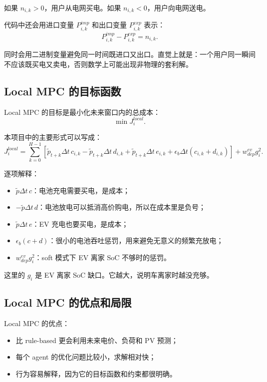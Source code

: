 \documentclass[UTF8,zihao=-4]{ctexart}
\begin{document}
如果 $n_{i,k}>0$，用户从电网买电。如果 $n_{i,k}<0$，用户向电网送电。

代码中还会用进口变量 $P^{imp}_{i,k}$ 和出口变量 $P^{exp}_{i,k}$ 表示：
\begin{equation}
P^{imp}_{i,k}-P^{exp}_{i,k}=n_{i,k}.
\end{equation}

同时会用二进制变量避免同一时间既进口又出口。直觉上就是：一个用户同一瞬间不应该既买电又卖电，否则数学上可能出现非物理的套利解。

\subsection{Local MPC 的目标函数}

Local MPC 的目标是最小化未来窗口内的总成本：
\begin{equation}
\min J_i^{local}.
\end{equation}

本项目中的主要形式可以写成：
\begin{equation}
J_i^{local}
=
\sum_{k=0}^{H-1}
\left[
\tilde p_{t+k}\Delta t\,c_{i,k}
-\tilde p_{t+k}\Delta t\,d_{i,k}
+\tilde p_{t+k}\Delta t\,e_{i,k}
+\epsilon_b\Delta t(c_{i,k}+d_{i,k})
\right]
+w^{ev}_{dep}g_i^2.
\end{equation}

逐项解释：
\begin{itemize}
  \item $\tilde p\Delta t\,c$：电池充电需要买电，是成本；
  \item $-\tilde p\Delta t\,d$：电池放电可以抵消高价购电，所以在成本里是负号；
  \item $\tilde p\Delta t\,e$：EV 充电也要买电，是成本；
  \item $\epsilon_b(c+d)$：很小的电池吞吐惩罚，用来避免无意义的频繁充放电；
  \item $w^{ev}_{dep}g_i^2$：soft 模式下 EV 离家 SoC 不够时的惩罚。
\end{itemize}

这里的 $g_i$ 是 EV 离家 SoC 缺口。它越大，说明车离家时越没充够。

\subsection{Local MPC 的优点和局限}

Local MPC 的优点：
\begin{itemize}
  \item 比 rule-based 更会利用未来电价、负荷和 PV 预测；
  \item 每个 agent 的优化问题比较小，求解相对快；
  \item 行为容易解释，因为它的目标函数和约束都很明确。
\end{itemize}
\end{document}
